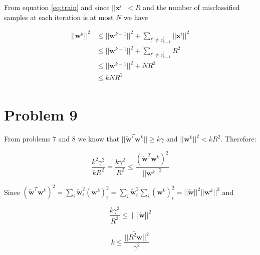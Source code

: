 \documentclass[12pt]{article}
\begin{document}
From equation \ref{eq:train} and since $||\mathbf{x}^i|| < R$ and the number of misclassified samples at each iteration is at most $N$ we have

\begin{equation}
 \begin{align}
  ||\mathbf{w}^k||^2 &\leq ||\mathbf{w}^{k-1}||^2 + \sum_{t^i \neq z_{k-1}^i} ||\mathbf{x}^i||^2 \\
		     &\leq ||\mathbf{w}^{k-1}||^2 + \sum_{t^i \neq z_{k-1}^i} R^2 \\
		     &\leq ||\mathbf{w}^{k-1}||^2 + N R^2 \\
		     &\leq k N R^2 \\
 \end{align}
\end{equation}

\section*{Problem 9}
  From problems 7 and 8 we know that $||\widetilde{\mathbf{w}}^T \mathbf{w}^k|| \geq k \gamma$ and $||\mathbf{w}^k||^2 < k R^2$. Therefore:

\begin{equation}
 \frac{k^2 \gamma^2}{k R^2} = \frac{k \gamma^2}{R^2} \leq \frac{\left( \widetilde{\mathbf{w}}^T \mathbf{w}^k \right)^2}{||\mathbf{w}^k||^2}
\end{equation}

Since $\left( \widetilde{\mathbf{w}}^T \mathbf{w}^k \right)^2 = \sum_i \widetilde{\mathbf{w}}_i^2 (\mathbf{w}^k)_i^2 = \sum_i \widetilde{\mathbf{w}}_i^2 \sum_i (\mathbf{w}^k)_i^2 = ||\widetilde{\mathbf{w}}||^2 ||\mathbf{w}^k||^2$ and

\begin{equation}
 \frac{k \gamma^2}{R^2} \leq \||\widetilde{\mathbf{w}}||^2
\end{equation}

\begin{equation}
 k \leq \frac{||\widetilde{R^2 \mathbf{w}}||^2}{\gamma^2}
\end{equation}


  
\end{document}
